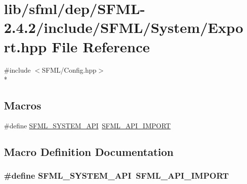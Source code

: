 \hypertarget{sfml_2dep_2_s_f_m_l-2_84_82_2include_2_s_f_m_l_2_system_2_export_8hpp}{\section{lib/sfml/dep/\-S\-F\-M\-L-\/2.4.2/include/\-S\-F\-M\-L/\-System/\-Export.hpp File Reference}
\label{sfml_2dep_2_s_f_m_l-2_84_82_2include_2_s_f_m_l_2_system_2_export_8hpp}
}
{\ttfamily \#include $<$S\-F\-M\-L/\-Config.\-hpp$>$}\\*
\subsection*{Macros}
\begin{DoxyCompactItemize}
\item 
\#define \hyperlink{sfml_2dep_2_s_f_m_l-2_84_82_2include_2_s_f_m_l_2_system_2_export_8hpp_a6476c9e422606477a4c23d92b1d79a1f}{S\-F\-M\-L\-\_\-\-S\-Y\-S\-T\-E\-M\-\_\-\-A\-P\-I}~\hyperlink{sfml_2dep_2_s_f_m_l-2_84_82_2include_2_s_f_m_l_2_config_8hpp_aba0bbe5791bee6633caa835c7f6a12a4}{S\-F\-M\-L\-\_\-\-A\-P\-I\-\_\-\-I\-M\-P\-O\-R\-T}
\end{DoxyCompactItemize}


\subsection{Macro Definition Documentation}
\hypertarget{sfml_2dep_2_s_f_m_l-2_84_82_2include_2_s_f_m_l_2_system_2_export_8hpp_a6476c9e422606477a4c23d92b1d79a1f}{
\subsubsection[{S\-F\-M\-L\-\_\-\-S\-Y\-S\-T\-E\-M\-\_\-\-A\-P\-I}]{\setlength{\rightskip}{0pt plus 5cm}\#define S\-F\-M\-L\-\_\-\-S\-Y\-S\-T\-E\-M\-\_\-\-A\-P\-I~{\bf S\-F\-M\-L\-\_\-\-A\-P\-I\-\_\-\-I\-M\-P\-O\-R\-T}}}\label{sfml_2dep_2_s_f_m_l-2_84_82_2include_2_s_f_m_l_2_system_2_export_8hpp_a6476c9e422606477a4c23d92b1d79a1f}
